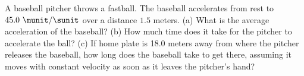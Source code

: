 %
A baseball pitcher throws a fastball. The baseball accelerates from
rest to $45.0\ \munit/\sunit$ over a distance $1.5$ meters.
%
(a) What is the average acceleration of the baseball?\answercheck\hwendpart
%
(b) How much time does it take for the pitcher to accelerate the
ball?\answercheck\hwendpart
%
(c) If home plate is 18.0 meters away from where the pitcher releases
the baseball, how long does the baseball take to get there, assuming
it moves with constant velocity as soon as it leaves the pitcher's
hand?\answercheck
